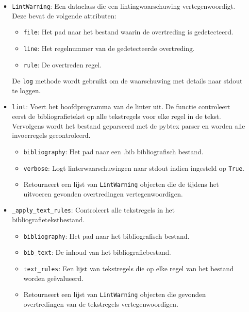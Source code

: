 \begin{itemize}
    \item \texttt{LintWarning}:
    Een dataclass die een lintingwaarschuwing vertegenwoordigt. Deze bevat de volgende attributen:
    \begin{itemize}
        \item \texttt{file}: Het pad naar het bestand waarin de overtreding is gedetecteerd.
        \item \texttt{line}: Het regelnummer van de gedetecteerde overtreding.
        \item \texttt{rule}: De overtreden regel.
    \end{itemize}
    De \texttt{log} methode wordt gebruikt om de waarschuwing met details naar stdout te loggen.

    \item \texttt{lint}:
    Voert het hoofdprogramma van de linter uit. De functie controleert eerst de bibliografietekst op alle tekstregels voor elke regel in de tekst. Vervolgens wordt het bestand geparseerd met de pybtex parser en worden alle invoerregels gecontroleerd.
    \begin{itemize}
        \item \texttt{bibliography}: Het pad naar een .bib bibliografisch bestand.
        \item \texttt{verbose}: Logt linterwaarschuwingen naar stdout indien ingesteld op \texttt{True}.
        \item Retourneert een lijst van \texttt{LintWarning} objecten die de tijdens het uitvoeren gevonden overtredingen vertegenwoordigen.
    \end{itemize}

    \item \texttt{\_apply\_text\_rules}:
    Controleert alle tekstregels in het bibliografietekstbestand.
    \begin{itemize}
        \item \texttt{bibliography}: Het pad naar het bibliografisch bestand.
        \item \texttt{bib\_text}: De inhoud van het bibliografiebestand.
        \item \texttt{text\_rules}: Een lijst van tekstregels die op elke regel van het bestand worden geëvalueerd.
        \item Retourneert een lijst van \texttt{LintWarning} objecten die gevonden overtredingen van de tekstregels vertegenwoordigen.
    \end{itemize}


\end{itemize}
